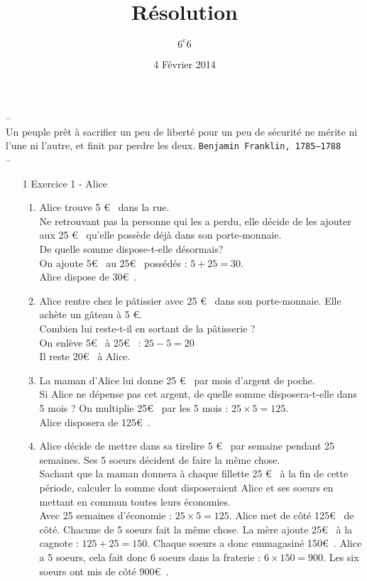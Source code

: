 \documentclass[11pt]{article}
\title{Résolution} %
\author{$6^e 6$}
\date{4 Février 2014} %
\begin{document}

\begin{center}
  \textsf{--}\\
  \textsf{Un peuple prêt à sacrifier un peu de liberté pour un peu de sécurité ne mérite ni l'une ni l'autre, et finit par perdre les deux.}
  \texttt{Benjamin Franklin, 1785–1788}\\
  \textsf{--}
\end{center}

\vspace{-0.5cm}

\setlength{\columnseprule}{1pt}
\begin{multicols}{2}


\begin{enumerate}
\item[1] Exercice 1 - Alice
  \begin{enumerate}
  \item Alice trouve 5 \euro~ dans la rue.\\
    Ne retrouvant pas la personne qui les a perdu, elle décide de les ajouter aux 25 \euro~ qu’elle possède déjà dans son porte-monnaie.\\
    De quelle somme dispose-t-elle désormais?\\
    On ajoute 5\euro~ au 25\euro~ possédés : $5 + 25 = 30$.\\
    Alice dispose de 30\euro~.

  \item Alice rentre chez le pâtissier avec 25 \euro~ dans son porte-monnaie. Elle achète un gâteau à 5 \euro.\\
    Combien lui reste-t-il en sortant de la pâtisserie ?\\
    On enlève 5\euro~ à 25\euro~ : $25 - 5 = 20$\\
    Il reste 20\euro~ à Alice.
  \item La maman d’Alice lui donne 25 \euro~ par mois d’argent de poche. \\
    Si Alice ne dépense pas cet argent, de quelle somme disposera-t-elle dans 5 mois ?
    On multiplie 25\euro~ par les 5 mois : $25 \times 5 = 125$.\\
    Alice disposera de 125\euro~.
  \item Alice décide de mettre dans sa tirelire 5 \euro~ par semaine pendant 25 semaines. Ses 5 soeurs décident de faire la même chose. \\
    Sachant que la maman donnera à chaque fillette 25 \euro~ à la fin de cette période, calculer la somme dont disposeraient Alice et ses soeurs en mettant en commun toutes leurs économies.\\
Avec 25 semaines d'économie : $25 \times 5 = 125$. Alice met de côté 125\euro~ de côté. Chacune de 5 soeurs fait la même chose. La mère ajoute 25\euro~ à la cagnote : $125 + 25 = 150$. Chaque soeurs a donc emmagasiné 150\euro~. 
Alice a 5 soeurs, cela fait donc 6 soeurs dans la fraterie : $6 \times 150 = 900$. 
Les six soeurs ont mis de côté 900\euro~.


\end{enumerate}
\end{enumerate}
\end{multicols}
\end{document}
